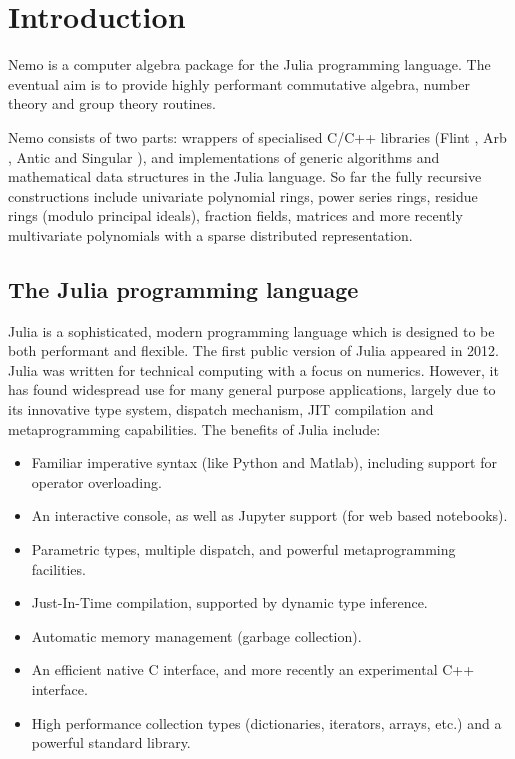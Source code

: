 \documentclass{sig-alternate-05-2015}
\begin{document}
\section{Introduction}

Nemo is a computer algebra package for the Julia programming language. The eventual aim is
to provide highly performant commutative algebra, number theory and group theory routines.

Nemo consists of two parts: wrappers of specialised C/C++
libraries (Flint \cite{flint}, Arb \cite{arb}, Antic \cite{antic} and Singular
\cite{singular}), and
implementations of generic algorithms and mathematical data
structures in the Julia language. So far the fully recursive constructions include
univariate polynomial rings, power series rings, residue rings (modulo principal ideals),
fraction fields, matrices and more recently multivariate polynomials with a sparse
distributed representation.

\subsection{The Julia programming language}

Julia \cite{julia} is a sophisticated, modern programming language which is designed
to be both performant and flexible.
The first public version of Julia appeared in 2012. 
Julia was written for technical computing with a
focus on numerics. However, it has found widespread use for many general purpose
applications, largely due to its innovative type system, dispatch mechanism, JIT
compilation and metaprogramming capabilities.
The benefits of Julia include:

\begin{itemize}
\item Familiar imperative syntax (like Python and Matlab), including support for operator overloading.
\item An interactive console, as well as Jupyter support (for web based notebooks).
\item Parametric types, multiple dispatch, and powerful metaprogramming facilities.
\item Just-In-Time compilation, supported by dynamic type inference.
\item Automatic memory management (garbage collection).
\item An efficient native C interface, and more recently an experimental C++ interface.
\item High performance collection types (dictionaries, iterators, arrays, etc.) and a powerful standard library.
\end{itemize}
\end{document}
